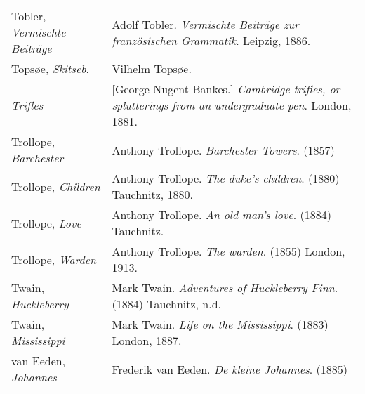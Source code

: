 \begin{longtable}{p{} p{}}
\raggedright {Tobler, \textit{Vermischte Beiträge}} & Adolf Tobler. \textit{Vermischte Beiträge zur französischen Grammatik}. Leipzig, 1886. \\ %

Topsøe, \textit{Skitseb}. & Vilhelm Topsøe. \\ %

\textit{Trifles} & [George Nugent-Bankes.] \textit{Cambridge trifles, or splutterings from an undergraduate pen}. London, 1881. \\ %

Trollope, \textit{Barchester} & Anthony Trollope. \textit{Barchester Towers}. (1857) \\
Trollope, \textit{Children} & Anthony Trollope. \textit{The duke's children}. (1880) Tauchnitz, 1880.  \\
Trollope, \textit{Love} & Anthony Trollope. \textit{An old man's love}. (1884) Tauchnitz. \\
Trollope, \textit{Warden} & Anthony Trollope. \textit{The warden}. (1855) London, 1913. \\

Twain, \textit{Huckleberry} & Mark Twain. \textit{Adventures of Huckleberry Finn}. (1884) Tauchnitz, n.d. \\
Twain, \textit{Mississippi} & Mark Twain. \textit{Life on the Mississippi}. (1883) London, 1887. \\
%

van Eeden, \textit{Johannes} & Frederik van Eeden. \textit{De kleine Johannes}. (1885) \\
%


\end{longtable}
